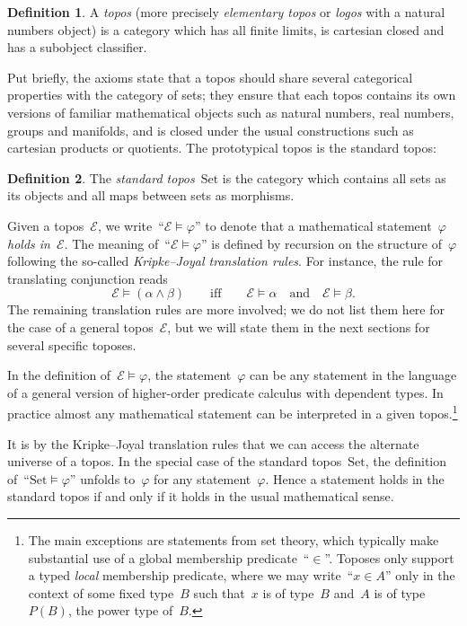 \documentclass[oneside]{amsart}
\theoremstyle{definition}
\newtheorem{defn}{Definition}[section]
\theoremstyle{plain}
\theoremstyle{remark}
\newcommand{\E}{\mathcal{E}}
\newcommand{\Set}{\mathrm{Set}}
\renewcommand{\_}{\mathpunct{.}\,}
\newcommand{\?}{\,{:}\,}
\begin{document}
\begin{defn}A \emph{topos} (more precisely \emph{elementary topos} or
\emph{logos} with a natural numbers object) is a category which has all finite
limits, is cartesian closed and has a subobject classifier.\end{defn}

Put briefly, the axioms state that a topos should share several categorical
properties with the category of sets; they ensure that each topos contains its
own versions of familiar mathematical objects such as natural numbers, real
numbers, groups and manifolds, and is closed under the usual constructions
such as cartesian products or quotients.
The prototypical topos is the standard topos:

\begin{defn}The \emph{standard topos}~$\Set$ is the category which contains all
sets as its objects and all maps between sets as morphisms.\end{defn}

Given a topos~$\E$, we write~``$\E \models \varphi$'' to denote that a
mathematical statement~$\varphi$ \emph{holds in~$\E$}. The meaning of~``$\E \models
\varphi$'' is defined by recursion on the structure of~$\varphi$ following the
so-called \emph{Kripke--Joyal translation rules}. For instance, the rule for
translating conjunction reads
\[ \E \models (\alpha \wedge \beta) \qquad\text{iff}\qquad
  \E \models \alpha \quad\text{and}\quad \E \models \beta. \]
The remaining translation rules are more involved; we do not list them here for
the case of a general topos~$\E$, but we will state them in the next sections
for several specific toposes.

In the definition of~$\E \models \varphi$, the statement~$\varphi$ can be any
statement in the language of a general version of higher-order predicate
calculus with dependent types. In practice almost any mathematical statement
can be interpreted in a given topos.\footnote{The main exceptions are
statements from set theory, which typically make substantial use of a global
membership predicate~``$\in$''. Toposes only support a typed \emph{local}
membership predicate, where we may write~``$x \in A$'' only in the context of
some fixed type~$B$ such that~$x$ is of type~$B$ and~$A$ is of
type~$P(B)$, the power type of~$B$.}

It is by the Kripke--Joyal translation rules that we can access the alternate
universe of a topos. In the special case of the standard topos~$\Set$, the
definition of~``$\Set \models \varphi$'' unfolds to~$\varphi$ for any
statement~$\varphi$. Hence a statement holds in the standard topos if and only
if it holds in the usual mathematical sense.
\end{document}
